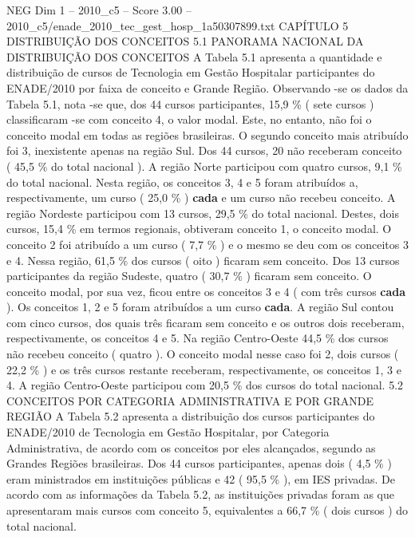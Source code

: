 \begin{textsample}{NEG Dim 1 – 2010\_c5 – Score 3.00 – 2010\_c5/enade\_2010\_tec\_gest\_hosp\_1a50307899.txt}  \label{ex:f1_neg_309}
CAPÍTULO 5 DISTRIBUIÇÃO DOS CONCEITOS 5.1 PANORAMA NACIONAL DA DISTRIBUIÇÃO DOS CONCEITOS A Tabela 5.1 apresenta a quantidade e distribuição de cursos de Tecnologia em Gestão Hospitalar participantes do ENADE/2010 por faixa de conceito e Grande Região.
Observando -se os dados da Tabela 5.1, nota -se que, dos 44 cursos participantes, 15,9 \% ( sete cursos ) classificaram -se com conceito 4, o valor modal.
Este, no entanto, não foi o conceito modal em todas as regiões brasileiras.
O segundo conceito mais atribuído foi 3, inexistente apenas na região Sul.
Dos 44 cursos, 20 não receberam conceito ( 45,5 \% do total nacional ).
A região Norte participou com quatro cursos, 9,1 \% do total nacional.
Nesta região, os conceitos 3, 4 e 5 foram atribuídos a, respectivamente, um curso ( 25,0 \% ) \textbf{cada} e um curso não recebeu conceito.
A região Nordeste participou com 13 cursos, 29,5 \% do total nacional.
Destes, dois cursos, 15,4 \% em termos regionais, obtiveram conceito 1, o conceito modal.
O conceito 2 foi atribuído a um curso ( 7,7 \% ) e o mesmo se deu com os conceitos 3 e 4.
Nessa região, 61,5 \% dos cursos ( oito ) ficaram sem conceito.
Dos 13 cursos participantes da região Sudeste, quatro ( 30,7 \% ) ficaram sem conceito.
O conceito modal, por sua vez, ficou entre os conceitos 3 e 4 ( com três cursos \textbf{cada} ).
Os conceitos 1, 2 e 5 foram atribuídos a um curso \textbf{cada}.
A região Sul contou com cinco cursos, dos quais três ficaram sem conceito e os outros dois receberam, respectivamente, os conceitos 4 e 5.
Na região Centro-Oeste 44,5 \% dos cursos não recebeu conceito ( quatro ).
O conceito modal nesse caso foi 2, dois cursos ( 22,2 \% ) e os três cursos restante receberam, respectivamente, os conceitos 1, 3 e 4.
A região Centro-Oeste participou com 20,5 \% dos cursos do total nacional. 5.2 CONCEITOS POR CATEGORIA ADMINISTRATIVA E POR GRANDE REGIÃO A Tabela 5.2 apresenta a distribuição dos cursos participantes do ENADE/2010 de Tecnologia em Gestão Hospitalar, por Categoria Administrativa, de acordo com os conceitos por eles alcançados, segundo as Grandes Regiões brasileiras.
Dos 44 cursos participantes, apenas dois ( 4,5 \% ) eram ministrados em instituições públicas e 42 ( 95,5 \% ), em IES privadas.
De acordo com as informações da Tabela 5.2, as instituições privadas foram as que apresentaram mais cursos com conceito 5, equivalentes a 66,7 \% ( dois cursos ) do total nacional.

\end{textsample}
